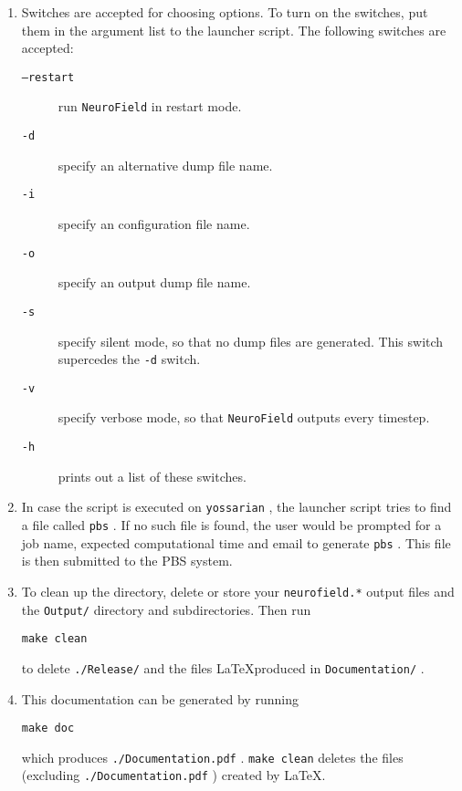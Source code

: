 \documentclass[12pt,a4paper]{article}
\newcommand{\type}[1]{ {\small\small\tt #1} }
\begin{document}
\begin{enumerate}
\item Switches are accepted for choosing options. To turn on the switches, put them in the argument list to the launcher script. The following switches are accepted:
	\begin{description}
	\item[\type{--restart}] run \type{NeuroField} in restart mode.
	\item[\type{-d}] specify an alternative dump file name.
	\item[\type{-i}] specify an configuration file name.
	\item[\type{-o}] specify an output dump file name.
	\item[\type{-s}] specify silent mode, so that no dump files are generated. This switch supercedes the \type{-d} switch.
	\item[\type{-v}] specify verbose mode, so that \type{NeuroField} outputs every timestep.
	\item[\type{-h}] prints out a list of these switches.
	\end{description}

\item In case the script is executed on \type{yossarian}, the launcher script tries to find a file called \type{pbs}. If no such file is found, the user would be prompted for a job name, expected computational time and email to generate \type{pbs}. This file is then submitted to the PBS system.

\item To clean up the directory, delete or store your \type{neurofield.*} output files and the \type{Output/} directory and subdirectories. Then run
\begin{lstlisting}
make clean
\end{lstlisting}
to delete \type{./Release/} and the files \LaTeX produced in \type{Documentation/}.

\item This documentation can be generated by running 
\begin{lstlisting}
make doc
\end{lstlisting}
which produces \type{./Document\-ation.pdf}. \type{make clean} deletes the files (excluding \type{./Document\-ation.pdf}) created by \LaTeX.

\end{enumerate}

\end{document}
